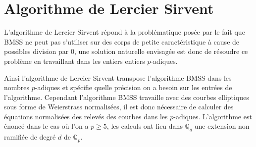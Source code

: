\documentclass[10pt,a4paper]{book}
\theoremstyle{plain}
\theoremstyle{definition}
\theoremstyle{definition}
\theoremstyle{definition}
\theoremstyle{definition}
\theoremstyle{remark}
\theoremstyle{remark}
\theoremstyle{definition}
\begin{document}


\section{Algorithme de Lercier Sirvent}
L'algorithme de Lercier Sirvent répond à la problématique posée par le fait que BMSS ne peut pas s'utiliser sur des corps de petite caractéristique à cause de possibles division par $0$, une solution naturelle envisagée est donc de résoudre ce problème en travaillant dans les entiers entiers $p$-adiques.

Ainsi l'algorithme de Lercier Sirvent transpose l'algorithme BMSS dans les nombres $p$-adiques et spécifie quelle précision on a besoin sur les entrées de l'algorithme. Cependant l'algorithme  BMSS travaille avec des courbes elliptiques sous forme de Weierstrass normalisées, il est donc nécessaire de calculer des équations normalisées des relevés des courbes dans les $p$-adiques. L'algorithme est énoncé dans le cas où l'on a $p \geqslant 5$, les calculs ont lieu dans $\mathbb{Q}_q$ une extension non ramifiée de degré $d$ de $\mathbb{Q}_p$.
\end{document}
